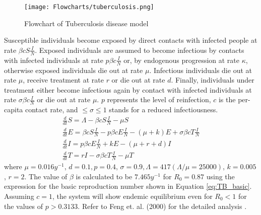 \documentclass{book}\usepackage[]{graphicx}\usepackage[]{color}
\begin{document}
\begin{figure}
    \centering
    \texttt{[image: Flowcharts/tuberculosis.png]}
    \caption{Flowchart of Tuberculosis disease model}
    \label{fig:tuberculosis_flow}
\end{figure}
Susceptible individuals become exposed by direct contacts with infected people at rate $\beta c S\frac{I}{N}$. Exposed individuals are assumed to become infectious by contacts with infected individuals at rate $p \beta c \frac{I}{N}$ or, by endogenous progression at rate $\kappa$, otherwise exposed individuals die out at rate $\mu$. Infectious individuals die out at rate $\mu$, receive treatment at rate $r$ or die out at rate $d$. Finally, individuals under treatment either become infectious again by contact with infected individuals at rate $\sigma \beta c \frac{I}{N}$ or die out at rate $\mu$.
$p$ represents the level of  reinfection, $c$ is the per-capita contact rate, and  $\leq\sigma\leq 1$ stands for a reduced infectiousness.
%
\begin{equation} \label{eq:TB_model}
\begin{array}{l}
\frac{d}{d t} S=\Lambda-\beta c S \frac{I}{N}-\mu S \\
\frac{d}{d t} E=\beta c S \frac{I}{N}-p \beta c E \frac{I}{N}-(\mu+k) E+\sigma \beta c T \frac{I}{N} \\
\frac{d}{d t} I=p \beta c E \frac{I}{N}+k E-(\mu+r+d) I \\
\frac{d}{d t} T=r I-\sigma \beta c T \frac{I}{N}-\mu T
\end{array}
\end{equation}
%
where $\mu=0.016 y^{-1}$, $d=0.1, p=0.4$, $\sigma=0.9, \Lambda=417(\Lambda / \mu=25000)$, $k=0.005$, $r=2$. The value of $\beta$ is calculated to be $7.465 y^{-1}$ for $R_0 = 0.87$ using the expression for the basic reproduction number shown in Equation \ref{eq:TB_basic}. Assuming $c = 1$, the system will show endemic equilibrium even for $R_0<1$ for the values of $p>0.3133$. Refer to Feng et. al. (2000) for the detailed analysis \cite{feng2000model}.

\end{document}
